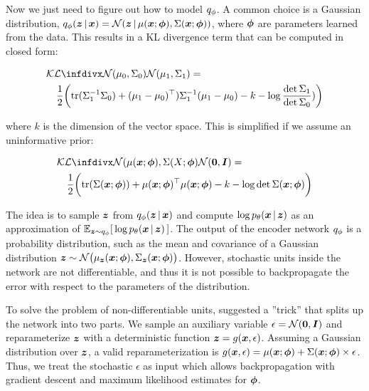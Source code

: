 Now we just need to figure out how to model $q_{\phi}$. A common choice is a Gaussian distribution, $\qphi \given{\vz}{\vx} = \mathcal{N}\given{\vz}{\mu (\vx;\vph), \Sigma(\vx; \vph)}$, where $\boldsymbol{\phi}$ are parameters learned from the data. This results in a KL divergence term that can be computed in closed form:

\begin{align}
\nonumber \lefteqn{\KL{\mathcal{N}(\mu_0, \Sigma_0)}{\mathcal{N}(\mu_1, \Sigma_1)} =} \\
& & \frac{1}{2} \bigg{(} \text{tr}(\Sigma_1^{-1}\Sigma_0) + (\mu_1 - \mu_0)^\top)\Sigma_1^{-1}(\mu_1 - \mu_0) - k - \log \frac{\det \Sigma_1}{\det \Sigma_0}) \bigg{)}
\label{kl-closed-form-eq1}
\end{align}

where $k$ is the dimension of the vector space. This is simplified if we assume an uninformative prior:

\begin{align}
\nonumber \lefteqn{ \KL{\mathcal{N}(\mu (\vx; \vph), \Sigma (X; \vph)}{ \mathcal{N}(\vec{0}, \vec{I})} =}\\
& & \frac{1}{2} \bigg{(} \text{tr}(\Sigma (\vx; \vph)) + \mu (\vx; \vph)^\top \mu (\vx; \vph) - k - \log{\det{\Sigma (\vx; \vph)}} \bigg{)}
\label{kl-closed-form-eq2}
\end{align}

The idea is to sample $\boldsymbol{z}$ from $\qphi \given{\vz}{\vx}$ and compute $\log{ p_\theta \given{\vx}{\vz}}$ as an approximation of $\E_{\vz \sim \qphi} [\,\log{\ptheta \given{\vx}{\vz}}\,]$. The output of the encoder network $q_{\phi}$ is a probability distribution, such as the mean and covariance of a Gaussian distribution $\boldsymbol{z} \sim \mathcal{N}\big(\mu_{\boldsymbol{z}} (\boldsymbol{x}; \boldsymbol{\phi}), \Sigma_{\boldsymbol{z}} (\boldsymbol{x}; \boldsymbol{\phi})\big)$. However, stochastic units inside the network are not differentiable, and thus it is not possible to backpropagate the error with respect to the parameters of the distribution.

To solve the problem of non-differentiable units, \parencite{kingma2013auto} suggested a ''trick'' that splits up the network into two parts. We sample an auxiliary variable $\epsilon = \mathcal{N}(\boldsymbol{0}, \boldsymbol{I})$ and reparameterize $\boldsymbol{z}$ with a deterministic function $\boldsymbol{z}=g(\boldsymbol{x}, \epsilon)$. Assuming a Gaussian distribution over $\boldsymbol{z}$, a valid reparameterization is $g(\boldsymbol{x}, \epsilon) = \mu(\boldsymbol{x}; \boldsymbol{\phi}) + \Sigma(\boldsymbol{x}; \boldsymbol{\phi}) \times \epsilon$.
Thus, we treat the stochastic $\epsilon$ as input which allows backpropagation with gradient descent and maximum likelihood estimates for $\boldsymbol{\phi}$.


